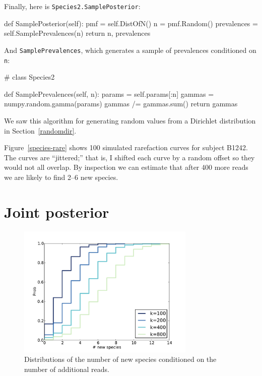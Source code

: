 \documentclass[12pt]{book}
\theoremstyle{exercise}
\begin{document}
Finally, here is {\tt Species2.SamplePosterior}:

\begin{code}
    def SamplePosterior(self):
        pmf = self.DistOfN()
        n = pmf.Random()
        prevalences = self.SamplePrevalences(n)
        return n, prevalences
\end{code}

And {\tt SamplePrevalences}, which generates a sample of
prevalences conditioned on {\tt n}:

\begin{code}
# class Species2

    def SamplePrevalences(self, n):
        params = self.params[:n]
        gammas = numpy.random.gamma(params)
        gammas /= gammas.sum()
        return gammas
\end{code}

We saw this algorithm for generating random values from a Dirichlet
distribution in Section~\ref{randomdir}.

Figure~\ref{species-rare} shows 100 simulated rarefaction curves
for subject B1242.  The curves are ``jittered;''
that is, I shifted each curve by a random offset so they
would not all overlap.  By inspection we can estimate that after
400 more reads we are likely to find 2--6 new species.


\section{Joint posterior}

\begin{figure}
\centerline{\includegraphics[height=2.5in]{figs/species-cond-B1242.pdf}}
\caption{Distributions of the number of new species conditioned on
the number of additional reads.}
\label{species-cond}
\end{figure}
\end{document}
